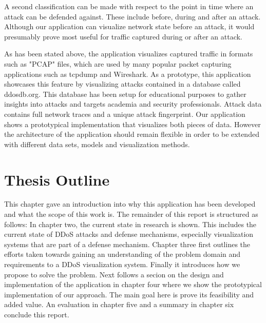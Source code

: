 A second classification can be made with respect to the point in time where an attack can be defended against. These include before, during and after an attack.
Although our application can visualize network state before an attack, it would presumably prove most useful for traffic captured during or after an attack\cite{zargar}.

As has been stated above, the application visualizes captured traffic in formats such as "PCAP" files, which are used by many popular packet capturing applications such as tcpdump and Wireshark. As a prototype, this application showcases this feature by visualizing attacks contained in a database called ddosdb.org. This database has been setup for educational purposes to gather insights into attacks and targets academia and security professionals. Attack data contains full network traces and a unique attack fingerprint\cite{ddosdb}. Our application shows a prototypical implementation that visualizes both pieces of data. However the architecture of the application should remain flexible in order to be extended with different data sets, models and visualization methods.

\section{Thesis Outline}

This chapter gave an introduction into why this application has been developed and what the scope of this work is. The remainder of this report is structured as follows: In chapter two, the current state in research is shown. This includes the current state of DDoS attacks and defense mechanisms, especially visualization systems that are part of a defense mechanism. Chapter three first outlines the efforts taken towards gaining an understanding of the problem domain and requirements to a DDoS visualization system. Finally it introduces how we propose to solve the problem. Next follows a secion on the design and implementation of the application in chapter four where we show the prototypical implementation of our approach. The main goal here is prove its feasibility and added value. An evaluation in chapter five and a summary in chapter six conclude this report.